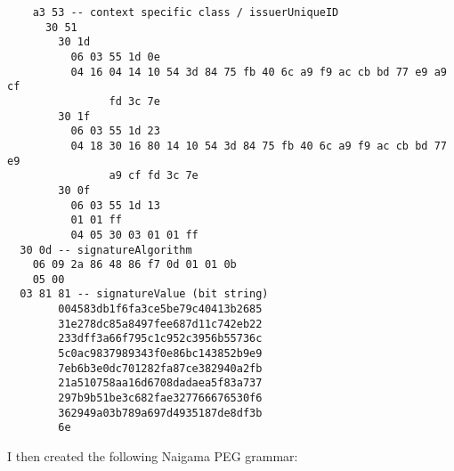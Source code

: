 \begin{changemargin}{-60mm}{0mm}
\begin{myquote}
\begin{verbatim}
    a3 53 -- context specific class / issuerUniqueID
      30 51
        30 1d
          06 03 55 1d 0e
          04 16 04 14 10 54 3d 84 75 fb 40 6c a9 f9 ac cb bd 77 e9 a9 cf
                fd 3c 7e 
        30 1f
          06 03 55 1d 23
          04 18 30 16 80 14 10 54 3d 84 75 fb 40 6c a9 f9 ac cb bd 77 e9
                a9 cf fd 3c 7e 
        30 0f
          06 03 55 1d 13
          01 01 ff
          04 05 30 03 01 01 ff
  30 0d -- signatureAlgorithm
    06 09 2a 86 48 86 f7 0d 01 01 0b
    05 00
  03 81 81 -- signatureValue (bit string)
        004583db1f6fa3ce5be79c40413b2685
        31e278dc85a8497fee687d11c742eb22
        233dff3a66f795c1c952c3956b55736c
        5c0ac9837989343f0e86bc143852b9e9
        7eb6b3e0dc701282fa87ce382940a2fb
        21a510758aa16d6708dadaea5f83a737
        297b9b51be3c682fae327766676530f6
        362949a03b789a697d4935187de8df3b
        6e
\end{verbatim}
\end{myquote}
\end{changemargin}
I then created the following Naigama PEG grammar:

